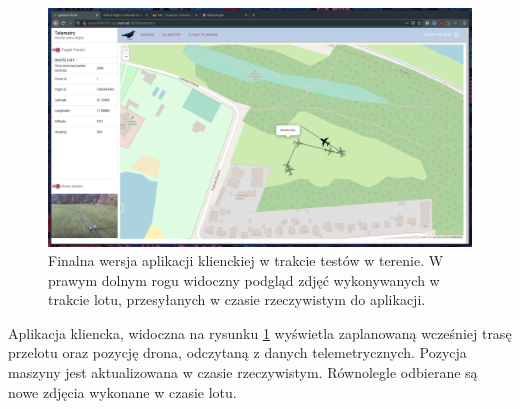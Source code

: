 \begin{figure}[H]
	\centering
	\includegraphics[width=0.8\linewidth]{rys05/final_flight_telem.png}
    \caption{
        Finalna wersja aplikacji klienckiej w trakcie testów w terenie. 
        W prawym dolnym rogu widoczny podgląd zdjęć wykonywanych w trakcie lotu,
        przesyłanych w czasie rzeczywistym do aplikacji.
    }
	\label{final_frontend}
\end{figure}

Aplikacja kliencka, widoczna na rysunku \ref{final_frontend} wyświetla zaplanowaną
wcześniej trasę przelotu oraz pozycję drona, odczytaną z danych telemetrycznych.
Pozycja maszyny jest aktualizowana w czasie rzeczywistym. Równolegle odbierane
są nowe zdjęcia wykonane w czasie lotu.

